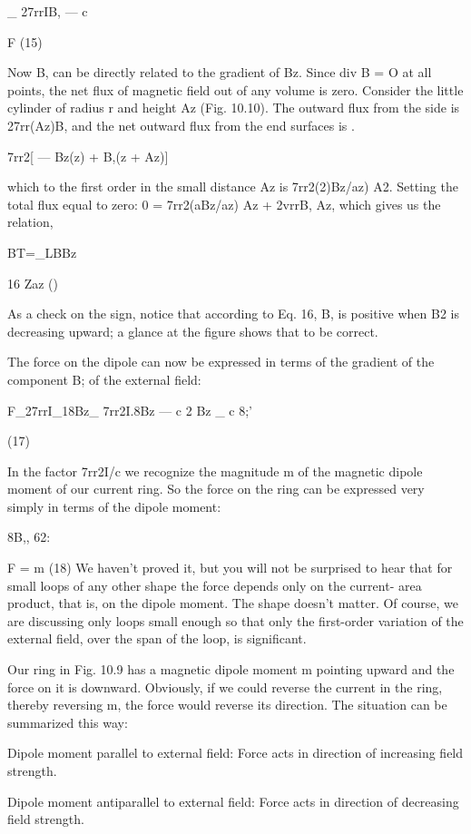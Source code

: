 {{_ 27rrIB,
 ---  c

F (15)

Now B, can be directly related to the gradient of Bz. Since
div B = O at all points, the net flux of magnetic field out of any
volume is zero. Consider the little cylinder of radius r and height Az
(Fig. 10.10). The outward flux from the side is 27rr(Az)B, and the
net outward flux from the end surfaces is .

7rr2[ --- Bz(z) + B,(z + Az)]

which to the first order in the small distance Az is 7rr2(2)Bz/az) A2.
Setting the total flux equal to zero: 0 = 7rr2(aBz/az) Az + 2vrrB, Az,
which gives us the relation,

BT=_LBBz

16
Zaz ()

As a check on the sign, notice that according to Eq. 16, B, is positive
when B2 is decreasing upward; a glance at the figure shows that to
be correct.

The force on the dipole can now be expressed in terms of the
gradient of the component B; of the external field:

F_27rrI_18Bz_ 7rr2I.8Bz
 ---  c 2 Bz _ c 8;'

(17)

In the factor 7rr2I/c we recognize the magnitude m of the magnetic
dipole moment of our current ring. So the force on the ring can be
expressed very simply in terms of the dipole moment:

8B,,
62:

F = m (18)
We haven't proved it, but you will not be surprised to hear that for
small loops of any other shape the force depends only on the current-
area product, that is, on the dipole moment. The shape doesn't
matter. Of course, we are discussing only loops small enough so
that only the first-order variation of the external field, over the span
of the loop, is significant.

Our ring in Fig. 10.9 has a magnetic dipole moment m pointing
upward and the force on it is downward. Obviously, if we could
reverse the current in the ring, thereby reversing m, the force would
reverse its direction. The situation can be summarized this way:

Dipole moment parallel to external field: Force acts in direction
of increasing field strength.

Dipole moment antiparallel to external field: Force acts in
direction of decreasing field strength.

}}

